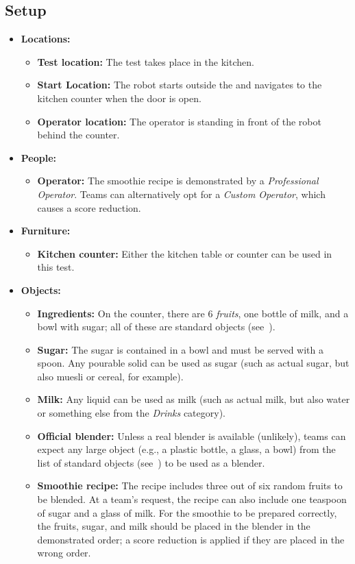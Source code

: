 \subsection*{Setup}
\begin{itemize}[nosep]
    \item \textbf{Locations:}
        \begin{itemize}
            \item \textbf{Test location:} The test takes place in the kitchen.
            \item \textbf{Start Location:} The robot starts outside the \Arena{} and navigates to the kitchen counter when the door is open.
            \item \textbf{Operator location:} The operator is standing in front of the robot behind the counter.
        \end{itemize}
    \item \textbf{People:}
        \begin{itemize}
            \item \textbf{Operator:} The smoothie recipe is demonstrated by a \emph{Professional Operator}. Teams can alternatively opt for a \emph{Custom Operator}, which causes a score reduction.
        \end{itemize}
    \item \textbf{Furniture:}
	    \begin{itemize}
            \item \textbf{Kitchen counter:} Either the kitchen table or counter can be used in this test.
        \end{itemize}
    \item \textbf{Objects:}
        \begin{itemize}
            \item \textbf{Ingredients:} On the counter, there are 6 \emph{fruits}, one bottle of milk, and a bowl with sugar; all of these are standard objects (see~).
            \item \textbf{Sugar:} The sugar is contained in a bowl and must be served with a spoon. Any pourable solid can be used as sugar (such as actual sugar, but also muesli or cereal, for example).
            \item \textbf{Milk:} Any liquid can be used as milk (such as actual milk, but also water or something else from the \emph{Drinks} category).
            \item \textbf{Official blender:} Unless a real blender is available (unlikely), teams can expect any large object (e.g., a plastic bottle, a glass, a bowl) from the list of standard objects (see~) to be used as a blender.
            \item \textbf{Smoothie recipe:} The recipe includes three out of six random fruits to be blended.
            At a team's request, the recipe can also include one teaspoon of sugar and a glass of milk.
            For the smoothie to be prepared correctly, the fruits, sugar, and milk should be placed in the blender in the demonstrated order; a score reduction is applied if they are placed in the wrong order.
        \end{itemize}
\end{itemize}

